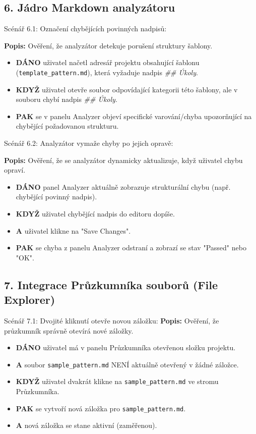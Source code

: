 \documentclass[12pt, a4paper]{article}
\begin{document}
\subsection*{6. Jádro Markdown analyzátoru}

Scénář 6.1: Označení chybějících povinných nadpisů:

\textbf{Popis:} Ověření, že analyzátor detekuje porušení struktury šablony.
\begin{itemize}
    \item \textbf{DÁNO} uživatel načetl adresář projektu obsahující šablonu (\texttt{template\_pattern.md}), která vyžaduje nadpis \textit{\#\# Úkoly}.
    \item \textbf{KDYŽ} uživatel otevře soubor odpovídající kategorii této šablony, ale v souboru chybí nadpis \textit{\#\# Úkoly}.
    \item \textbf{PAK} se v panelu Analyzer objeví specifické varování/chyba upozorňující na chybějící požadovanou strukturu.
\end{itemize}

Scénář 6.2: Analyzátor vymaže chyby po jejich opravě:

\textbf{Popis:} Ověření, že se analyzátor dynamicky aktualizuje, když uživatel chybu opraví.
\begin{itemize}
    \item \textbf{DÁNO} panel Analyzer aktuálně zobrazuje strukturální chybu (např. chybějící povinný nadpis).
    \item \textbf{KDYŽ} uživatel chybějící nadpis do editoru dopíše.
    \item \textbf{A} uživatel klikne na "Save Changes".
    \item \textbf{PAK} se chyba z panelu Analyzer odstraní a zobrazí se stav "Passed" nebo "OK".
\end{itemize}

\subsection*{7. Integrace Průzkumníka souborů (File Explorer)}

Scénář 7.1: Dvojité kliknutí otevře novou záložku:
\textbf{Popis:} Ověření, že průzkumník správně otevírá nové záložky.
\begin{itemize}
    \item \textbf{DÁNO} uživatel má v panelu Průzkumníka otevřenou složku projektu.
    \item \textbf{A} soubor \texttt{sample\_pattern.md} NENÍ aktuálně otevřený v žádné záložce.
    \item \textbf{KDYŽ} uživatel dvakrát klikne na \texttt{sample\_pattern.md} ve stromu Průzkumníka.
    \item \textbf{PAK} se vytvoří nová záložka pro \texttt{sample\_pattern.md}.
    \item \textbf{A} nová záložka se stane aktivní (zaměřenou).
\end{itemize}
\end{document}
